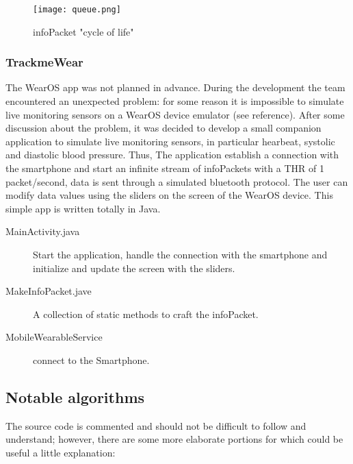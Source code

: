 \documentclass[../main.tex]{subfiles}
\begin{document}
\begin{figure}[H]
	\centering
	\texttt{[image: queue.png]}
	\caption{infoPacket "cycle of life"}
	\label{fig:infopacketscycle.png}
\end{figure}

\subsubsection{TrackmeWear}
The WearOS app was not planned in advance. During the development the team encountered an unexpected problem: for some reason it is impossible to simulate live monitoring sensors on a WearOS device emulator (see reference).
After some discussion about the problem, it was decided to develop a small companion application to simulate live monitoring sensors, in particular hearbeat, systolic and diastolic blood pressure.
Thus, The application establish a connection with the smartphone and start an infinite stream of infoPackets with a THR of 1 packet/second, data is sent through a simulated bluetooth protocol. The user can modify data values using the sliders on the screen of the
WearOS device. This simple app is written totally in Java.

\begin{description}
	\item[MainActivity.java] Start the application, handle the connection with the smartphone and initialize and update the screen with the sliders.
	\item[MakeInfoPacket.jave] A collection of static methods to craft the infoPacket.
	\item[MobileWearableService] connect to the Smartphone.
\end{description}

\subsection{Notable algorithms}

The source code is commented and should not be difficult to follow and understand; however, there are some more elaborate portions for which could be useful a little explanation:
\end{document}
